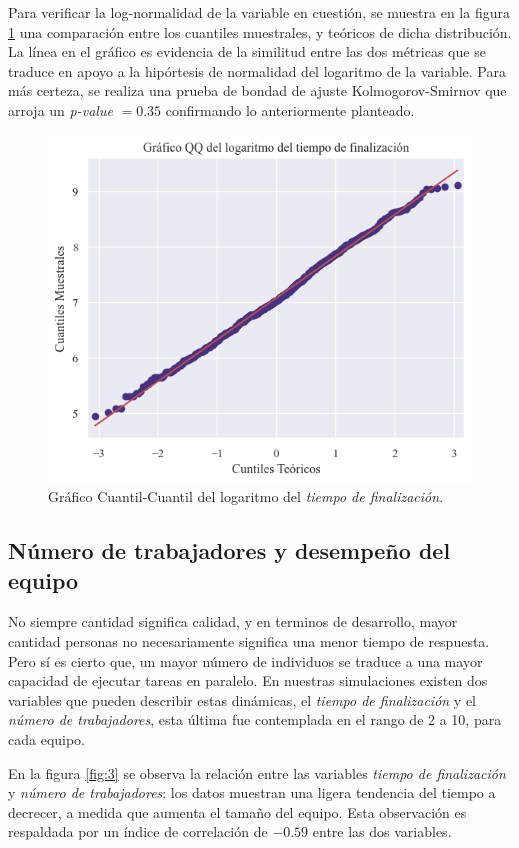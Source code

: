 \documentclass[a4paper, 12pt]{article}
\begin{document}
	Para verificar la log-normalidad de la variable en cuestión, se muestra en la figura \ref{fig:2} una comparación entre los cuantiles muestrales, y teóricos de dicha distribución. La línea en el gráfico es evidencia de la similitud entre las dos métricas que se traduce en apoyo a la hipórtesis de normalidad del logaritmo de la variable. Para más certeza, se realiza una prueba de bondad de ajuste Kolmogorov-Smirnov que arroja un \emph{p-value} $ = 0.35$ confirmando lo anteriormente planteado.
	
	\begin{figure}[htb!]
		\centering
		\includegraphics[height = .50\linewidth, width=.50\linewidth]{assets/log_time_qq}
		\caption{Gráfico Cuantil-Cuantil del logaritmo del  \emph{tiempo de finalización}.}
		\label{fig:2}
	\end{figure}
	
\subsection{Número de trabajadores y desempeño del equipo}

	No siempre cantidad significa calidad, y en terminos de desarrollo, mayor cantidad personas no necesariamente significa una menor tiempo de respuesta. Pero sí es cierto que, un mayor número de individuos se traduce a una mayor capacidad de ejecutar tareas en paralelo. En nuestras simulaciones existen dos variables que pueden describir estas dinámicas, el \emph{tiempo de finalización} y el \emph{número de trabajadores}, esta última fue contemplada en el rango de 2 a 10, para cada equipo.
	
	En la figura \ref{fig:3} se observa la relación entre las variables \emph{tiempo de finalización} y \emph{número de trabajadores}: los datos muestran una ligera tendencia del tiempo a decrecer, a medida que aumenta el tamaño del equipo. Esta observación es respaldada por un índice de correlación de $-0.59$ entre las dos variables.
	
\end{document}
